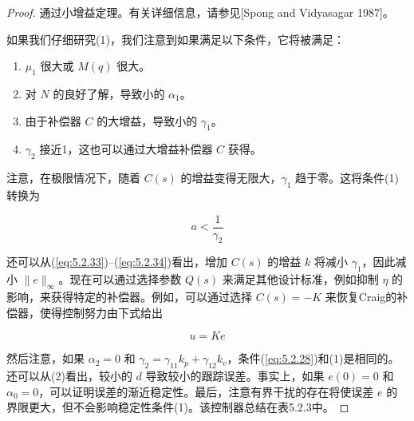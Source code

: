 \documentclass[UTF8,12pt,a4paper]{ctexart}
\begin{document}
\begin{proof}
通过小增益定理。有关详细信息，请参见[Spong and Vidyasagar 1987]。

如果我们仔细研究(1)，我们注意到如果满足以下条件，它将被满足：
\begin{enumerate}
    \item $\mu_1$ 很大或 $M(q)$ 很大。
    \item 对 $N$ 的良好了解，导致小的 $\alpha_1$。
    \item 由于补偿器 $C$ 的大增益，导致小的 $\gamma_1$。
    \item $\gamma_2$ 接近1，这也可以通过大增益补偿器 $C$ 获得。
\end{enumerate}

注意，在极限情况下，随着 $C(s)$ 的增益变得无限大，$\gamma_1$ 趋于零。这将条件(1)转换为

\begin{equation}\label{eq:5.2.34}
a < \frac{1}{\gamma_2}
\end{equation}

还可以从(\ref{eq:5.2.33})--(\ref{eq:5.2.34})看出，增加 $C(s)$ 的增益 $k$ 将减小 $\gamma_1$，因此减小 $\|e\|_\infty$。现在可以通过选择参数 $Q(s)$ 来满足其他设计标准，例如抑制 $\eta$ 的影响，来获得特定的补偿器。例如，可以通过选择 $C(s) = -K$ 来恢复Craig的补偿器，使得控制努力由下式给出

\begin{equation}\label{eq:5.2.35}
u = Ke
\end{equation}

然后注意，如果 $\alpha_2 = 0$ 和 $\gamma_2 = \gamma_{11}k_p + \gamma_{12}k_v$，条件(\ref{eq:5.2.28})和(1)是相同的。还可以从(2)看出，较小的 $d$ 导致较小的跟踪误差。事实上，如果 $e(0) = 0$ 和 $\alpha_0 = 0$，可以证明误差的渐近稳定性。最后，注意有界干扰的存在将使误差 $e$ 的界限更大，但不会影响稳定性条件(1)。该控制器总结在表5.2.3中。


\end{proof}
\end{document}
